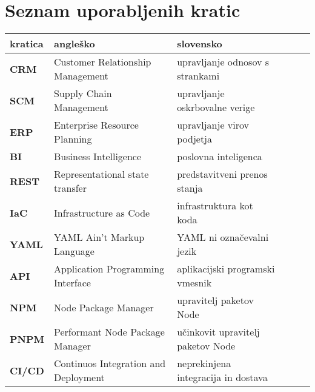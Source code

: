 \chapter*{Seznam uporabljenih kratic}

\begin{tabularx}{\textwidth}{lX|lX|lX}
  {\bf kratica} & {\bf angleško} & {\bf slovensko} \\ \hline
  {\bf CRM} & Customer Relationship Management & upravljanje odnosov s strankami \\
  {\bf SCM} & Supply Chain Management & upravljanje oskrbovalne verige \\
  {\bf ERP} & Enterprise Resource Planning & upravljanje virov podjetja \\
  {\bf BI} & Business Intelligence & poslovna inteligenca \\
  {\bf REST} & Representational state transfer & predstavitveni prenos stanja \\
  {\bf IaC} & Infrastructure as Code & infrastruktura kot koda \\
  {\bf YAML} & YAML Ain't Markup Language & YAML ni označevalni jezik \\
  {\bf API} & Application Programming Interface & aplikacijski programski vmesnik \\
  {\bf NPM} & Node Package Manager & upravitelj paketov Node \\
  {\bf PNPM} & Performant Node Package Manager & učinkovit upravitelj paketov Node \\
  {\bf CI/CD} & Continuos Integration and Deployment & neprekinjena integracija in dostava \\
\end{tabularx}